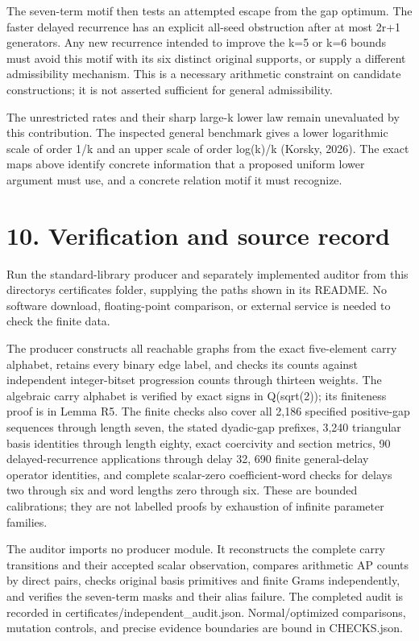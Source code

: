 The seven-term motif then tests an attempted escape from the gap optimum. The faster delayed recurrence has an explicit all-seed obstruction after at most 2r+1 generators. Any new recurrence intended to improve the k=5 or k=6 bounds must avoid this motif with its six distinct original supports, or supply a different admissibility mechanism. This is a necessary arithmetic constraint on candidate constructions; it is not asserted sufficient for general admissibility.

The unrestricted rates and their sharp large-k lower law remain unevaluated by this contribution. The inspected general benchmark gives a lower logarithmic scale of order 1/k and an upper scale of order log(k)/k (Korsky, 2026). The exact maps above identify concrete information that a proposed uniform lower argument must use, and a concrete relation motif it must recognize.

\section{10. Verification and source record}\label{n14-verification-and-source-record}

Run the standard-library producer and separately implemented auditor from this directory\textquotesingle s certificates folder, supplying the paths shown in its README. No software download, floating-point comparison, or external service is needed to check the finite data.

The producer constructs all reachable graphs from the exact five-element carry alphabet, retains every binary edge label, and checks its counts against independent integer-bitset progression counts through thirteen weights. The algebraic carry alphabet is verified by exact signs in Q(sqrt(2)); its finiteness proof is in Lemma R5. The finite checks also cover all 2,186 specified positive-gap sequences through length seven, the stated dyadic-gap prefixes, 3,240 triangular basis identities through length eighty, exact coercivity and section metrics, 90 delayed-recurrence applications through delay 32, 690 finite general-delay operator identities, and complete scalar-zero coefficient-word checks for delays two through six and word lengths zero through six. These are bounded calibrations; they are not labelled proofs by exhaustion of infinite parameter families.

The auditor imports no producer module. It reconstructs the complete carry transitions and their accepted scalar observation, compares arithmetic AP counts by direct pairs, checks original basis primitives and finite Grams independently, and verifies the seven-term masks and their alias failure. The completed audit is recorded in certificates/independent\_audit.json. Normal/optimized comparisons, mutation controls, and precise evidence boundaries are bound in CHECKS.json.

